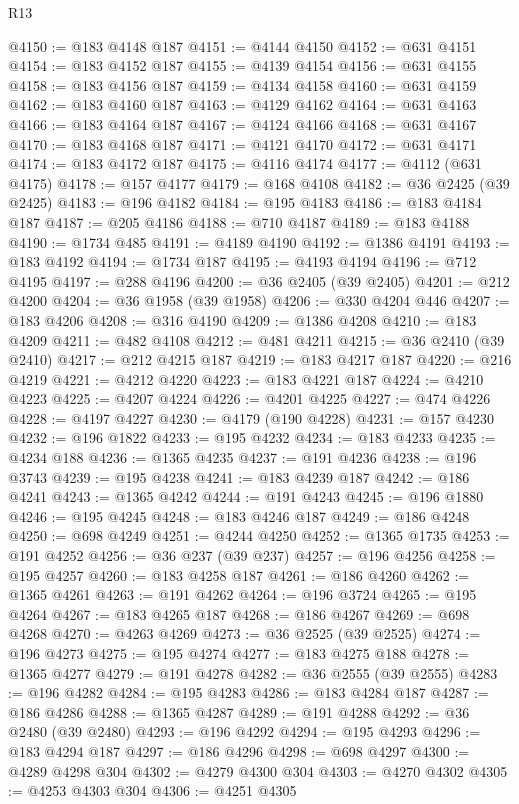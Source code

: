 \begin{lexlean}{R13}
\begin{coremodule}
@4150 := @183 @4148 @187
@4151 := @4144 @4150
@4152 := @631 @4151
@4154 := @183 @4152 @187
@4155 := @4139 @4154
@4156 := @631 @4155
@4158 := @183 @4156 @187
@4159 := @4134 @4158
@4160 := @631 @4159
@4162 := @183 @4160 @187
@4163 := @4129 @4162
@4164 := @631 @4163
@4166 := @183 @4164 @187
@4167 := @4124 @4166
@4168 := @631 @4167
@4170 := @183 @4168 @187
@4171 := @4121 @4170
@4172 := @631 @4171
@4174 := @183 @4172 @187
@4175 := @4116 @4174
@4177 := @4112 (@631 @4175)
@4178 := @157 @4177
@4179 := @168 @4108
@4182 := @36 @2425 (@39 @2425)
@4183 := @196 @4182
@4184 := @195 @4183
@4186 := @183 @4184 @187
@4187 := @205 @4186
@4188 := @710 @4187
@4189 := @183 @4188
@4190 := @1734 @485
@4191 := @4189 @4190
@4192 := @1386 @4191
@4193 := @183 @4192
@4194 := @1734 @187
@4195 := @4193 @4194
@4196 := @712 @4195
@4197 := @288 @4196
@4200 := @36 @2405 (@39 @2405)
@4201 := @212 @4200
@4204 := @36 @1958 (@39 @1958)
@4206 := @330 @4204 @446
@4207 := @183 @4206
@4208 := @316 @4190
@4209 := @1386 @4208
@4210 := @183 @4209
@4211 := @482 @4108
@4212 := @481 @4211
@4215 := @36 @2410 (@39 @2410)
@4217 := @212 @4215 @187
@4219 := @183 @4217 @187
@4220 := @216 @4219
@4221 := @4212 @4220
@4223 := @183 @4221 @187
@4224 := @4210 @4223
@4225 := @4207 @4224
@4226 := @4201 @4225
@4227 := @474 @4226
@4228 := @4197 @4227
@4230 := @4179 (@190 @4228)
@4231 := @157 @4230
@4232 := @196 @1822
@4233 := @195 @4232
@4234 := @183 @4233
@4235 := @4234 @188
@4236 := @1365 @4235
@4237 := @191 @4236
@4238 := @196 @3743
@4239 := @195 @4238
@4241 := @183 @4239 @187
@4242 := @186 @4241
@4243 := @1365 @4242
@4244 := @191 @4243
@4245 := @196 @1880
@4246 := @195 @4245
@4248 := @183 @4246 @187
@4249 := @186 @4248
@4250 := @698 @4249
@4251 := @4244 @4250
@4252 := @1365 @1735
@4253 := @191 @4252
@4256 := @36 @237 (@39 @237)
@4257 := @196 @4256
@4258 := @195 @4257
@4260 := @183 @4258 @187
@4261 := @186 @4260
@4262 := @1365 @4261
@4263 := @191 @4262
@4264 := @196 @3724
@4265 := @195 @4264
@4267 := @183 @4265 @187
@4268 := @186 @4267
@4269 := @698 @4268
@4270 := @4263 @4269
@4273 := @36 @2525 (@39 @2525)
@4274 := @196 @4273
@4275 := @195 @4274
@4277 := @183 @4275 @188
@4278 := @1365 @4277
@4279 := @191 @4278
@4282 := @36 @2555 (@39 @2555)
@4283 := @196 @4282
@4284 := @195 @4283
@4286 := @183 @4284 @187
@4287 := @186 @4286
@4288 := @1365 @4287
@4289 := @191 @4288
@4292 := @36 @2480 (@39 @2480)
@4293 := @196 @4292
@4294 := @195 @4293
@4296 := @183 @4294 @187
@4297 := @186 @4296
@4298 := @698 @4297
@4300 := @4289 @4298 @304
@4302 := @4279 @4300 @304
@4303 := @4270 @4302
@4305 := @4253 @4303 @304
@4306 := @4251 @4305

\end{coremodule}
\end{lexlean}
